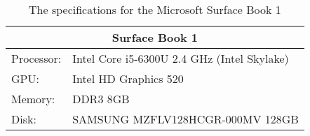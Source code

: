 \begin{table}[H]
    \begin{tabular}{ll}
    \hline
    \multicolumn{2}{|c|}{Surface Book 1}           \\ \hline
    Processor: & Intel Core i5-6300U 2.4 GHz (Intel Skylake)      \\
    GPU:       & Intel HD Graphics 520          \\
    Memory:    & DDR3 8GB                         \\
    Disk:      & SAMSUNG MZFLV128HCGR-000MV 128GB
    \end{tabular}
    \caption{The specifications for the Microsoft Surface Book 1}
    \label{tab:surfaceBook}
\end{table} 
